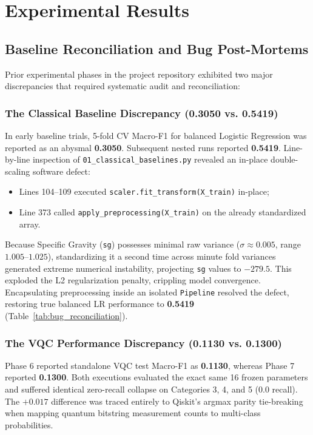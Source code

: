 \documentclass[conference]{IEEEtran}
\begin{document}
\section{Experimental Results}

\subsection{Baseline Reconciliation and Bug Post-Mortems}
Prior experimental phases in the project repository exhibited two major discrepancies that required systematic audit and reconciliation:

\subsubsection{The Classical Baseline Discrepancy (0.3050 vs. 0.5419)}
In early baseline trials, 5-fold CV Macro-F1 for balanced Logistic Regression was reported as an abysmal \textbf{0.3050}. Subsequent nested runs reported \textbf{0.5419}. Line-by-line inspection of \texttt{01\_classical\_baselines.py} revealed an in-place double-scaling software defect:
\begin{itemize}
    \item Lines 104--109 executed \texttt{scaler.fit\_transform(X\_train)} in-place;
    \item Line 373 called \texttt{apply\_preprocessing(X\_train)} on the already standardized array.
\end{itemize}
Because Specific Gravity (\texttt{sg}) possesses minimal raw variance ($\sigma \approx 0.005$, range $1.005$--$1.025$), standardizing it a second time across minute fold variances generated extreme numerical instability, projecting \texttt{sg} values to \textbf{$-279.5$}. This exploded the L2 regularization penalty, crippling model convergence. Encapsulating preprocessing inside an isolated \texttt{Pipeline} resolved the defect, restoring true balanced LR performance to \textbf{0.5419} (Table~\ref{tab:bug_reconciliation}).

\subsubsection{The VQC Performance Discrepancy (0.1130 vs. 0.1300)}
Phase 6 reported standalone VQC test Macro-F1 as \textbf{0.1130}, whereas Phase 7 reported \textbf{0.1300}. Both executions evaluated the exact same 16 frozen parameters and suffered identical zero-recall collapse on Categories 3, 4, and 5 (0.0 recall). The $+0.017$ difference was traced entirely to Qiskit's argmax parity tie-breaking when mapping quantum bitstring measurement counts to multi-class probabilities.
\end{document}
